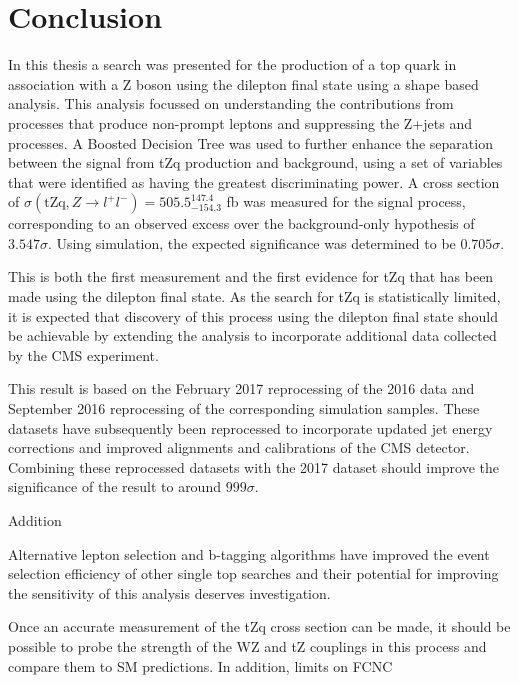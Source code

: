 \chapter{Conclusion}\label{chapter:conclusion}

In this thesis a search was presented for the production of a top quark in association with a Z boson using the dilepton final state using a shape based analysis.
This analysis focussed on understanding the contributions from processes that produce non-prompt leptons and suppressing the Z+jets and \ttbar processes.
A Boosted Decision Tree was used to further enhance the separation between the signal from tZq production and background, using a set of variables that were identified as having the greatest discriminating power.
A cross section of $\sigma (\textrm{tZq}, Z \rightarrow l^{+} l^{-}) = 505.5^{147.4}_{-154.3}$ fb was measured for the signal process, corresponding to an observed excess over the background-only hypothesis of $3.547\sigma$.
Using simulation, the expected significance was determined to be $0.705 \sigma$.

This is both the first measurement and the first evidence for tZq that has been made using the dilepton final state.
As the search for tZq is statistically limited, it is expected that discovery of this process using the dilepton final state should be achievable by extending the analysis to incorporate additional data collected by the CMS experiment.


This result is based on the February 2017 reprocessing of the 2016 data and September 2016 reprocessing of the corresponding simulation samples.
These datasets have subsequently been reprocessed to incorporate updated jet energy corrections and improved alignments and calibrations of the CMS detector.
Combining these reprocessed datasets with the 2017 dataset should improve the significance of the result to around $999\sigma$.

Addition

Alternative lepton selection and b-tagging algorithms have improved the event selection efficiency of other single top searches and their potential for improving the sensitivity of this analysis deserves investigation.

Once an accurate measurement of the tZq cross section can be made, it should be possible to probe  the strength of the WZ and tZ couplings in this process and compare them to SM predictions.
In addition, limits on FCNC

